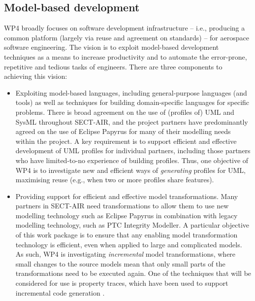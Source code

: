 \subsection{Model-based development}
WP4 broadly focuses on software development infrastructure -- i.e., producing a common platform (largely via reuse and agreement on standards) -- for aerospace
software engineering. The vision is to exploit model-based development techniques as a means to increase productivity and to automate the error-prone, repetitive
and tedious tasks of engineers. There are three components to achieving this vision:
\begin{itemize}
\item Exploiting model-based languages, including general-purpose languages (and tools) as well as techniques for building domain-specific languages for specific problems. 
There is broad agreement on the use of (profiles of) UML and SysML throughout SECT-AIR, and the project partners have predominantly agreed on the use of Eclipse
Papyrus for many of their modelling needs within the project. A key requirement is to support efficient and effective development of UML profiles for individual partners,
including those partners who have limited-to-no experience of building profiles. Thus, one objective of WP4 is to investigate new and efficient ways of \textit{generating}
profiles for UML, maximising reuse (e.g., when two or more profiles share features). %

\item Providing support for efficient and effective model transformations. Many partners in SECT-AIR need transformations to allow them to use new modelling
technology such as Eclipse Papyrus in combination with legacy modelling technology, such as PTC Integrity Modeller. A particular objective of this work package is to
ensure that any enabling model transformation technology is efficient, even when applied to large and complicated models. As such, WP4 is investigating 
\textit{incremental} model transformations, where small changes to the source models mean that only small parts of the transformations need to be executed
again. One of the techniques that will be considered for use is property traces, which have been used to support incremental code generation \cite{OgunyomiRK15}.



\end{itemize}
